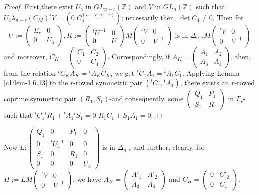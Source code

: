 \begin{proof}
First,\pageoriginale there exist $U_{4}$ in $GL_{n-r}(\mathbb{Z})$ and
$V$ in $GL_{n}(\mathbb{Z})$ such that
$U_{4}\lambda_{n-r}(C_{M}){}^{t}V=(0 \; C_{4}^{(n-r,n-r)})$; necessarily
then, $\det C_{4}\neq 0$. Then for 
$$
U:=
\begin{pmatrix}
E_{r} &0\\
0 & U_{4}
\end{pmatrix},
K:=
\begin{pmatrix}
{}^{t}U^{-1} & 0\\
0 & U
\end{pmatrix}
M
\begin{pmatrix}
{}^{t}V & 0\\
0 & V^{-1}
\end{pmatrix}
\text{ \  is in \ } \Delta_{n,r}M
\begin{pmatrix}
{}^{t}V & 0\\
0 & V^{-1}
\end{pmatrix}
$$
and moreover, $C_{K}=\left(\begin{smallmatrix} C_{1} & C_{2}\\ 0 &
  C_{4}
\end{smallmatrix}\right)$. Correspondingly, if
$A_{K}=\left(\begin{smallmatrix} A_{1} & A_{2}\\ A_{3} & A_{4}
\end{smallmatrix}\right)$, then, from the relation
${}^{t}C_{K}A_{K}={}^{t}A_{K}C_{K}$, we get
${}^{t}C_{1}A_{1}={}^{t}A_{1}C_{1}$. Applying Lemma \ref{c1:lem-1.6.13}
to the $r$-rowed symmetric pair $({}^{t}C_{1},{}^{t}A_{1})$, there
exists an $r$-rowed coprime symmetric pair $(R_{1},S_{1})$-and
consequently, some $\left(\begin{smallmatrix} Q_{1} & P_{1}\\ S_{1} &
  R_{1}
\end{smallmatrix}\right)$ in $\Gamma_{r}$-such that
${}^{t}C_{1}{}^{t}R_{1}+{}^{t}A_{1}{}^{t}S_{1}=0$ \ie
$R_{1}C_{1}+S_{1}A_{1}=0$. 
\end{proof}

Now $L:\left(\begin{smallmatrix} Q_{1} & 0 & P_{1} & 0\\ 0 &
  {}^{t}U^{-1}_{4} & 0 & 0\\ S_{1} & 0 & R_{1} & 0\\ 0 & 0 & 0 & U_{4}
\end{smallmatrix}\right)$ is in $\Delta_{n,r}$ and further, clearly,
for $H:=LM\left(\begin{smallmatrix} {}^{t}V & 0\\ 0 & V^{-1}
\end{smallmatrix}\right)$, we have $A_{H}=\left(\begin{smallmatrix}
  A'_{1} & A'_{2}\\ A_{3} & A_{4}\end{smallmatrix}\right)$ and
$C_{H}=\left(\begin{smallmatrix} 0 & C'_{2}\\ 0 & C_{4}
\end{smallmatrix}\right)$.

